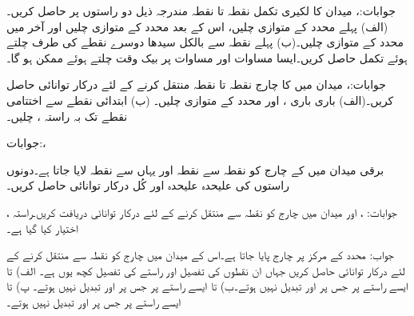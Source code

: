 جوابات:، 
میدان  کا لکیری تکمل  نقطہ  تا نقطہ  مندرجہ ذیل دو راستوں پر حاصل کریں۔(الف) پہلے  محدد کے متوازی چلیں، اس کے بعد  محدد کے متوازی چلیں اور آخر میں  محدد کے متوازی چلیں۔(ب) پہلے نقطہ سے بالکل سیدھا دوسرے نقطے کی طرف چلتے ہوئے تکمل حاصل کریں۔ایسا مساوات  اور مساوات  پر بیک وقت چلتے ہوئے ممکن ہو گا۔ 

جوابات:، 
میدان  میں  کا چارج نقطہ  تا نقطہ  منتقل کرنے کے لئے درکار توانائی حاصل کریں۔(الف) باری باری ،  اور  محدد کے متوازی چلیں۔ (ب) ابتدائی نقطے سے اختتامی نقطے تک بہ راستہ ،  چلیں۔

جوابات:، 

برقی میدان  میں  کے چارج کو نقطہ  سے نقطہ  اور  یہاں سے نقطہ  لایا جاتا ہے۔دونوں راستوں کی علیحدہ علیحدہ اور کُل درکار توانائی حاصل کریں۔

جوابات: ،  اور 
میدان  میں چارج  کو نقطہ  سے  منتقل کرنے کے لئے درکار توانائی دریافت کریں۔راستہ ،  اختیار کیا گیا ہے۔

جواب:
محدد کے مرکز پر  چارج پایا جاتا ہے۔اس کے میدان میں چارج  کو نقطہ  سے  منتقل کرنے کے لئے درکار توانائی حاصل کریں جہاں ان نقطوں کی تفصیل اور راستے کی تفصیل کچھ یوں ہے۔ الف)  تا  ایسے راستے پر جس پر  اور  تبدیل نہیں ہوتے۔ب)  تا  ایسے راستے پر جس پر  اور  تبدیل نہیں ہوتے۔ پ)  تا  ایسے راستے پر جس پر  اور  تبدیل نہیں ہوتے۔

